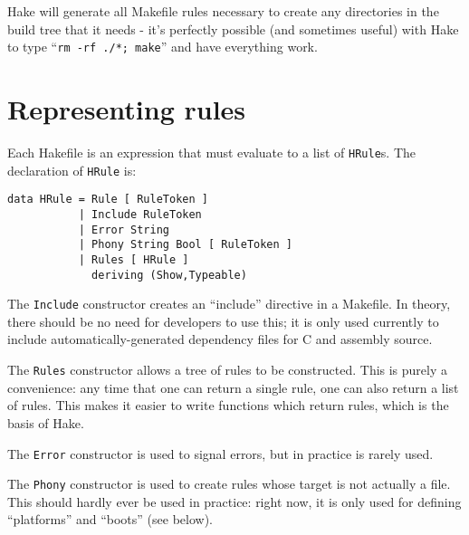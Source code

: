 \documentclass[a4paper,twoside]{report} %
\begin{document}
Hake will generate all Makefile rules necessary to create any
directories in the build tree that it needs - it's perfectly possible
(and sometimes useful) with Hake to type ``\texttt{rm -rf ./*;
  make}'' and have everything work.

\section{Representing rules}\label{sec:reprules}

Each Hakefile is an expression that must evaluate to a list of
\texttt{HRule}s.  The declaration of \texttt{HRule} is:
\begin{verbatim}
data HRule = Rule [ RuleToken ]
           | Include RuleToken
           | Error String
           | Phony String Bool [ RuleToken ]
           | Rules [ HRule ]
             deriving (Show,Typeable)
\end{verbatim}

The \texttt{Include} constructor creates an ``include'' directive in a
Makefile.  In theory, there should be no need for developers to use
this; it is only used currently to include automatically-generated
dependency files for C and assembly source.

The \texttt{Rules} constructor allows a tree of rules to be
constructed.  This is purely a convenience: any time that one can
return a single rule, one can also return a list of rules.  This makes
it easier to write functions which return rules, which is the basis of
Hake.

The \texttt{Error} constructor is used to signal errors, but in
practice is rarely used.

The \texttt{Phony} constructor is used to create rules whose target is
not actually a file.  This should hardly ever be used in practice:
right now, it is only used for defining ``platforms'' and ``boots''
(see below).
\end{document}
